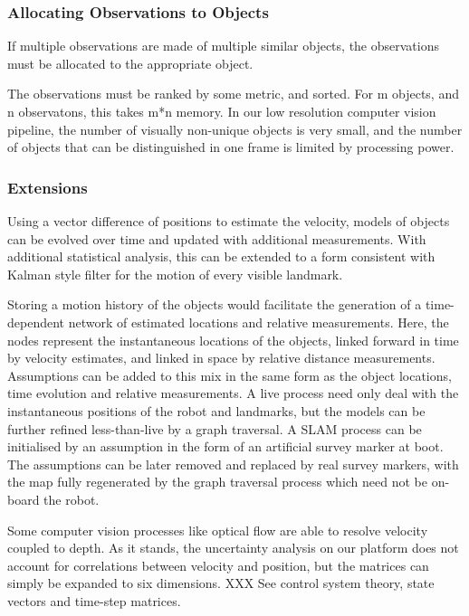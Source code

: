 \documentclass[a4paper, 11pt, titlepage]{article}
\begin{document}
    \subsubsection{Allocating Observations to Objects}
      If multiple observations are made of multiple similar objects, the observations must be allocated to the appropriate object.

      The observations must be ranked by some metric, and sorted.  For m objects, and n observatons, this takes m*n memory.  In our low resolution computer vision pipeline, the number of visually non-unique objects is very small, and the number of objects that can be distinguished in one frame is limited by processing power.



    \subsubsection{Extensions}
      Using a vector difference of positions to estimate the velocity, models of objects can be evolved over time and updated with additional measurements.  With additional statistical analysis, this can be extended to a form consistent with Kalman style filter for the motion of every visible landmark.

      Storing a motion history of the objects would facilitate the generation of a time-dependent network of estimated locations and relative measurements.
      Here, the nodes represent the instantaneous locations of the objects, linked forward in time by velocity estimates, and linked in space by relative distance measurements.  Assumptions can be added to this mix in the same form as the object locations, time evolution and relative measurements.  A live process need only deal with the instantaneous positions of the robot and landmarks, but the models can be further refined less-than-live by a graph traversal.
      A SLAM process can be initialised by an assumption in the form of an artificial survey marker at boot. The assumptions can be later removed and replaced by real survey markers, with the map fully regenerated by the graph traversal process which need not be on-board the robot.
      
      Some computer vision processes like optical flow are able to resolve velocity coupled to depth.
      As it stands, the uncertainty analysis on our platform does not account for correlations between velocity and position, but the matrices can simply be expanded to six dimensions.
      XXX See control system theory, state vectors and time-step matrices.
\end{document}
